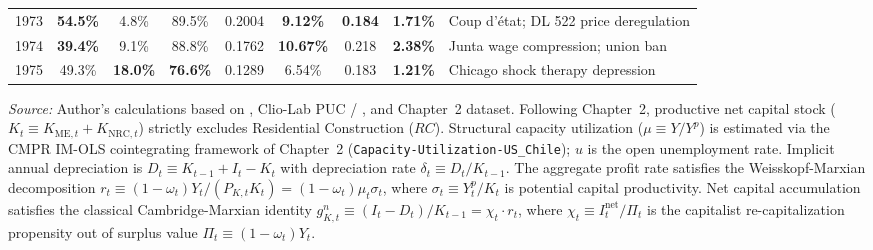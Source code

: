 \begin{table}[htbp]
{\begin{tabular}{lcccccccl}
1973 & \textbf{54.5\%} & 4.8\% & 89.5\% & 0.2004 & \textbf{9.12\%} & \textbf{0.184} & \textbf{1.71\%} & Coup d'état; DL 522 price deregulation \\
1974 & \textbf{39.4\%} & 9.1\% & 88.8\% & 0.1762 & \textbf{10.67\%} & 0.218 & \textbf{2.38\%} & Junta wage compression; union ban \\
1975 & 49.3\% & \textbf{18.0\%} & \textbf{76.6\%} & 0.1289 & 6.54\% & 0.183 & \textbf{1.21\%} & Chicago shock therapy depression \\
\bottomrule
\end{tabular}%
}
\begin{minipage}{0.96\textwidth}
\vspace{0.3em}
\footnotesize
\textit{Source:} Author's calculations based on \citet{Astorga2023}, Clio-Lab PUC / \citet{DiazLudersWagner2016}, and Chapter~2 dataset. Following Chapter~2, productive net capital stock ($K_t \equiv K_{\text{ME}, t} + K_{\text{NRC}, t}$) strictly excludes Residential Construction ($RC$). Structural capacity utilization ($\mu \equiv Y/Y^p$) is estimated via the CMPR IM-OLS cointegrating framework of Chapter~2 (\texttt{Capacity-Utilization-US\_Chile}); $u$ is the open unemployment rate. Implicit annual depreciation is $D_t \equiv K_{t-1} + I_t - K_t$ with depreciation rate $\delta_t \equiv D_t / K_{t-1}$. The aggregate profit rate satisfies the Weisskopf-Marxian decomposition $r_t \equiv (1 - \omega_t) Y_t / (P_{K, t} K_t) = (1 - \omega_t) \mu_t \sigma_t$, where $\sigma_t \equiv Y^p_t / K_t$ is potential capital productivity. Net capital accumulation satisfies the classical Cambridge-Marxian identity $g^n_{K, t} \equiv (I_t - D_t) / K_{t-1} = \chi_t \cdot r_t$, where $\chi_t \equiv I^{\text{net}}_t / \Pi_t$ is the capitalist re-capitalization propensity out of surplus value $\Pi_t \equiv (1 - \omega_t) Y_t$.
\end{minipage}
\end{table}
